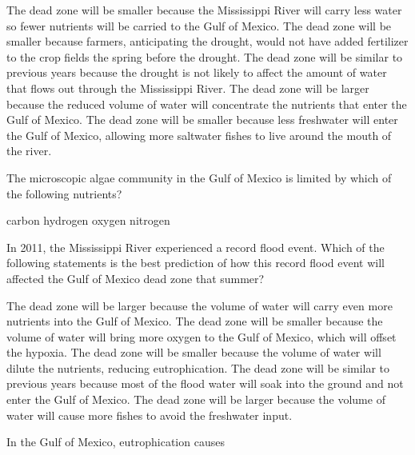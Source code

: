 \begin{choices}
\correctchoice The dead zone will be smaller because the Mississippi River will carry less water so fewer nutrients will be carried to the Gulf of Mexico.%
\choice The dead zone will be smaller because farmers, anticipating the drought, would not have added fertilizer to the crop fields the spring before the drought.%
\choice The dead zone will be similar to previous years because the drought is not likely to affect the amount of water that flows out through the Mississippi River.%
\choice The dead zone will be larger because the reduced volume of water will concentrate the nutrients that enter the Gulf of Mexico.%
\choice The dead zone will be smaller because less freshwater will enter the Gulf of Mexico, allowing more saltwater fishes to live around the mouth of the river.%
\end{choices}


\question
The microscopic algae community in the Gulf of Mexico is limited by which of the following nutrients?

\begin{choices}
\choice carbon%
\choice {}%
\choice hydrogen%
\choice oxygen%
\correctchoice nitrogen%
\end{choices}


\question
In 2011, the Mississippi River experienced a record flood event.  Which of the following statements is the best prediction of how this record flood event will affected the Gulf of Mexico dead zone that summer?

\begin{choices}
\correctchoice The dead zone will be larger because the volume of water will carry even more nutrients into the Gulf of Mexico.%
\choice The dead zone will be smaller because the volume of water will bring more oxygen to the Gulf of Mexico, which will offset the hypoxia.%
\choice The dead zone will be smaller because the volume of water will dilute the nutrients, reducing eutrophication.%
\choice The dead zone will be similar to previous years because most of the flood water will soak into the ground and not enter the Gulf of Mexico.%
\choice The dead zone will be larger because the volume of water will cause more fishes to avoid the freshwater input.%
\end{choices}

\question
In the Gulf of Mexico, eutrophication causes


